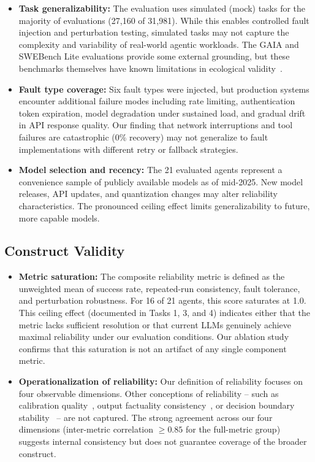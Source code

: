 \begin{itemize}
    \item \textbf{Task generalizability:} The evaluation uses simulated (mock) tasks for the majority of evaluations (27,160 of 31,981). While this enables controlled fault injection and perturbation testing, simulated tasks may not capture the complexity and variability of real-world agentic workloads. The GAIA and SWEBench Lite evaluations provide some external grounding, but these benchmarks themselves have known limitations in ecological validity~\cite{mialon2023gaia, jimenez2024swebench}.

    \item \textbf{Fault type coverage:} Six fault types were injected, but production systems encounter additional failure modes including rate limiting, authentication token expiration, model degradation under sustained load, and gradual drift in API response quality. Our finding that network interruptions and tool failures are catastrophic (0\% recovery) may not generalize to fault implementations with different retry or fallback strategies.

    \item \textbf{Model selection and recency:} The 21 evaluated agents represent a convenience sample of publicly available models as of mid-2025. New model releases, API updates, and quantization changes may alter reliability characteristics. The pronounced ceiling effect limits generalizability to future, more capable models.
\end{itemize}

\subsection{Construct Validity}

\begin{itemize}
    \item \textbf{Metric saturation:} The composite reliability metric is defined as the unweighted mean of success rate, repeated-run consistency, fault tolerance, and perturbation robustness. For 16 of 21 agents, this score saturates at 1.0. This ceiling effect (documented in Tasks 1, 3, and 4) indicates either that the metric lacks sufficient resolution or that current LLMs genuinely achieve maximal reliability under our evaluation conditions. Our ablation study confirms that this saturation is not an artifact of any single component metric.

    \item \textbf{Operationalization of reliability:} Our definition of reliability focuses on four observable dimensions. Other conceptions of reliability -- such as calibration quality~\cite{guo2017calibration}, output factuality consistency~\cite{min2023factual}, or decision boundary stability~\cite{jiang2021can} -- are not captured. The strong agreement across our four dimensions (inter-metric correlation $\geq 0.85$ for the full-metric group) suggests internal consistency but does not guarantee coverage of the broader construct.
\end{itemize}


